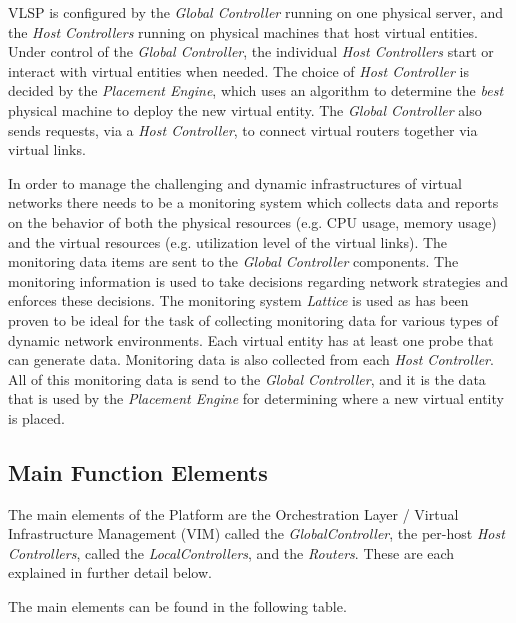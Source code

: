 \noindent VLSP is configured by the \emph{Global Controller} running 
on one physical server, and the \emph{Host Controllers} running on
physical machines that host virtual entities.
Under control of the
\emph{Global Controller}, the individual \emph{Host Controllers}
start or interact with virtual entities when needed. The choice of
\emph{Host Controller} is decided by the \emph{Placement Engine},
which uses an algorithm to determine the \emph{best} physical machine
to deploy the new virtual entity.  The \emph{Global Controller} also
sends requests, via a \emph{Host Controller}, to 
connect virtual routers together via virtual  links.

In order to manage the challenging and dynamic infrastructures of
virtual networks there needs to be a monitoring system which collects
data and reports on the behavior of both the physical resources
(e.g. CPU usage, memory usage) and the virtual resources
(e.g. utilization level of the virtual links). The monitoring data
items are sent to the \textit{Global Controller} components. The
monitoring information is used to take decisions regarding network
strategies and enforces these decisions. The monitoring system
\emph{Lattice} is used as has been proven to be ideal for the task of
collecting monitoring data for various types of dynamic network
environments.  Each virtual entity has at least one probe that can
generate data. Monitoring data is also collected from each \emph{Host
  Controller}. All of this monitoring data is send to the \emph{Global
  Controller}, and it is the data that is used by the \emph{Placement
  Engine} for determining where a new virtual entity is placed.


\subsection{Main Function Elements}



The main elements of the Platform are the Orchestration
Layer  / Virtual Infrastructure Management (VIM) called the  \emph{GlobalController},
the per-host \emph{Host Controllers}, called the \emph{LocalControllers}, and the \emph{Routers}.  These are each
explained in further detail below.

The main elements can be found in the following table.

